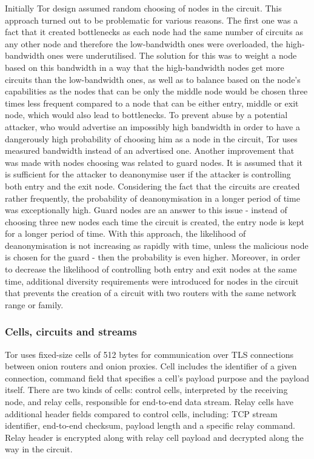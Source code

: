 Initially Tor design assumed random choosing of nodes in the circuit. This approach turned out to be problematic for various reasons. The first one was a fact that it created bottlenecks as each node had the same number of circuits as any other node and therefore the low-bandwidth ones were overloaded, the high-bandwidth ones were underutilised. The solution for this was to weight a node based on this bandwidth in a way that the high-bandwidth nodes get more circuits than the low-bandwidth ones, as well as to balance based on the node’s capabilities as the nodes that can be only the middle node would be chosen three times less frequent compared to a node that can be either entry, middle or exit node, which would also lead to bottlenecks. To prevent abuse by a potential attacker, who would advertise an impossibly high bandwidth in order to have a dangerously high probability of choosing him as a node in the circuit, Tor uses measured bandwidth instead of an advertised one. Another improvement that was made with nodes choosing was related to guard nodes. It is assumed that it is sufficient for the attacker to deanonymise user if the attacker is controlling both entry and the exit node. Considering the fact that the circuits are created rather frequently, the probability of deanonymisation in a longer period of time was exceptionally high. Guard nodes are an answer to this issue - instead of choosing three new nodes each time the circuit is created, the entry node is kept for a longer period of time. With this approach, the likelihood of deanonymisation is not increasing as rapidly with time, unless the malicious node is chosen for the guard - then the probability is even higher. Moreover, in order to decrease the likelihood of controlling both entry and exit nodes at the same time, additional diversity requirements were introduced for nodes in the circuit that prevents the creation of a circuit with two routers with the same network range or family.

\subsubsection{Cells, circuits and streams}
Tor uses fixed-size cells of 512 bytes for communication over TLS connections between onion routers and onion proxies. Cell includes the identifier of a given connection, command field that specifies a cell’s payload purpose and the payload itself. There are two kinds of cells: control cells, interpreted by the receiving node, and relay cells, responsible for end-to-end data stream. Relay cells have additional header fields compared to control cells, including: TCP stream identifier, end-to-end checksum, payload length and a specific relay command. Relay header is encrypted along with relay cell payload and decrypted along the way in the circuit.

